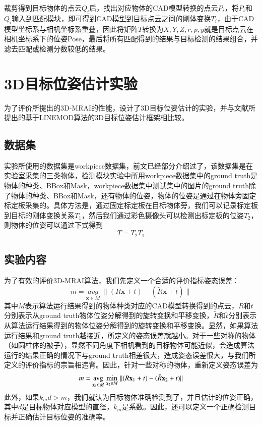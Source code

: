 裁剪得到目标物体的点云$Q_i$后，找出对应物体的CAD模型转换的点云$P_i$，将$P_i$和$Q_i$输入到匹配模块，即可得到CAD模型到目标点云之间的刚体变换$T_i$，由于CAD模型坐标系与相机坐标系重叠，因此将矩阵$T$转换为$X,Y,Z,r,p,y$就是目标点云在相机坐标系下的位姿Pose，最后将所有匹配得到的结果与目标检测的结果组合，并滤去匹配或检测分数较低的结果。

\section{3D目标位姿估计实验}
为了评价所提出的3D-MRAI的性能，设计了3D目标位姿估计的实验，并与文献\cite{hinterstoisser2012model}所提出的基于LINEMOD算法的3D目标位姿估计框架相比较。
\subsection{数据集}
实验所使用的数据集是workpiece数据集，前文已经部分介绍过了，该数据集是在实验室采集的三类物体，检测模块实验中所用workpiece数据集中的ground truth是物体的种类、BBox和Mask，workpiece数据集中测试集中的图片的ground truth除了物体的种类、BBox和Mask，还有物体的位姿，物体的位姿是通过在物体旁固定标定板采集的。具体方法是，通过固定标定板在目标物体旁，我们可以记录标定板到目标的刚体变换关系$T_1$，然后我们通过彩色摄像头可以检测出标定板的位姿$T_2$，则物体的位姿可以通过下式得到
\begin{equation}
  T = T_2T_1
\end{equation}

\subsection{实验内容}
为了有效的评价3D-MRAI算法，我们先定义一个合适的评价指标{\kai 姿态误差}：
\begin{equation}
  m = {\underset{\mathbf{x}\in M}{avg}} \; {\parallel (R\mathbf{x}+t) - (\tilde{R}\mathbf{x}+\tilde{t})\parallel}
\end{equation}
其中$M$表示算法运行结果得到的物体种类对应的CAD模型转换得到的点云，$R$和$t$分别表示从ground truth物体位姿分解得到的旋转变换和平移变换，$\tilde{R}$和$\tilde{t}$分别表示从算法运行结果得到的物体位姿分解得到的旋转变换和平移变换。显然，如果算法运行结果和ground truth越接近，所定义的姿态误差就越小。对于一些对称的物体（如圆柱体的被子），显然不同角度下相机看到的目标物体可能近似，会造成算法运行的结果正确的情况下与ground truth相差很大，造成姿态误差很大，与我们所定义的评价指标的宗旨相违背。因此，针对一些对称的物体，重新定义姿态误差为
\begin{equation}
  m = {\operatorname*{avg}_{\mathbf{x}_1\in M}} \; {\min_{\mathbf{x}_2\in M}} \; \lVert(R\mathbf{x}_1+t) - (\tilde{R}\mathbf{x}_2+t)\rVert
\end{equation}
此外，如果$k_md>m$，我们就认为目标物体准确检测到了，并且估计的位姿正确，其中$d$是目标物体对应模型的直径，$k_m$是系数。因此，还可以定义一个正确检测目标并正确估计目标位姿的准确率。

